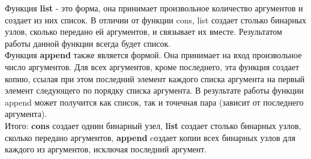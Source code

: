 Функция \textbf{list} - это форма, она принимает произвольное количество аргументов и создает из них список. В отличии от функции cons, list создает столько бинарных узлов, сколько передано ей аргументов, и связывает их вместе. Результатом работы данной функции всегда будет список.\\

Функция \textbf{append} также является формой. Она принимает на вход произвольное число аргументов. Для всех аргументов, кроме последнего, эта функция создает копию, ссылая при этом последний элемент каждого списка аргумента на первый элемент следующего по порядку списка аргумента. В результате работы функции append может получится как список, так и точечная пара (зависит от последнего аргумента). \\

Итого: \textbf{cons} создает однин бинарный узел, \textbf{list} создает столько бинарных узлов, сколько передано аргументов, \textbf{append} cоздает копии всех бинарных узлов для каждого из аргументов, исключая последний аргумент.\\